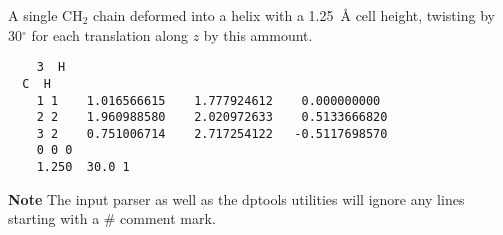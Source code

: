 A single CH$_2$ chain deformed into a helix with a 1.25~{\AA} cell
height, twisting by 30$^\circ$ for each translation along $z$ by this
ammount.
\begin{verbatim}
    3  H
  C  H
    1 1    1.016566615    1.777924612    0.000000000
    2 2    1.960988580    2.020972633    0.5133666820
    3 2    0.751006714    2.717254122   -0.5117698570
    0 0 0
    1.250  30.0 1
\end{verbatim}

{\bf Note} The \dftbp{} input parser as well as the dptools utilities will
ignore any lines starting with a \# comment mark.
